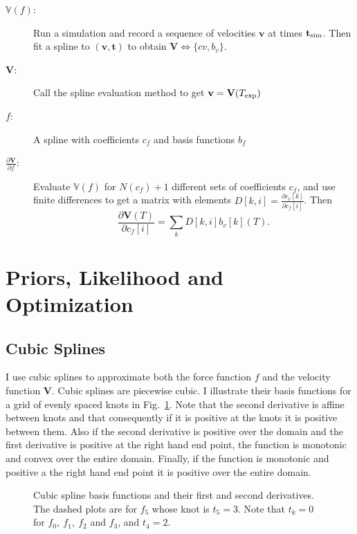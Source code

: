 \documentclass[11pt]{article}
\newcommand{\partiald}[2]{\frac{\partial #1}{\partial #2}}
\newcommand\bv{\mathbf{v}}
\newcommand\bt{\mathbf{t}}
\newcommand\Vfunc{\mathbb{V}}
\newcommand\Vt{\mathbf{V}}
\newcommand\texp{T_{\rm{exp}}}
\newcommand\cf{c_f}
\newcommand\cv{c_v}
\newcommand\fbasis{b_f}
\newcommand\vbasis{b_v}
\newcommand\tsim{{\mathbf t}_{\rm{sim}}}
\newcommand\DVDf{\partiald{\Vt}{f}}
\begin{document}
\begin{description}
\item[$\Vfunc(f)$:] Run a simulation and record a sequence of
  velocities $\bv$ at times $\tsim$.  Then fit a
  spline to $(\bv, \bt)$ to obtain $\Vt\iff \{cv,\vbasis\}$.
\item[$\Vt$:] Call the spline evaluation method to get $\bv = \Vt(\texp)$
\item[$f$:] A spline with coefficients $\cf$ and basis functions
  $\fbasis$
\item[$\DVDf$:] Evaluate $\Vfunc(f)$ for $N(\cf)+1$ different sets of
  coefficients $\cf$, and use finite differences to get a matrix with
  elements $D[k,i] = \partiald{\cv[k]}{\cf[i]}$.  Then
  \begin{equation*}
    \partiald{\Vt(T)}{\cf[i]} = \sum_k D[k,i] \vbasis[k](T).
  \end{equation*}
\end{description}

\section{Priors, Likelihood and Optimization}
\label{sec:opt}

\subsection{Cubic Splines}
\label{sec:splines}

I use cubic splines to approximate both the force function $f$ and the
velocity function $\Vt$.  Cubic splines are piecewise cubic.  I
illustrate their basis functions for a grid of evenly spaced knots in
Fig.~\ref{fig:basis}.  Note that the second derivative is affine
between knots and that consequently if it is positive at the knots it
is positive between them.  Also if the second derivative is positive
over the domain and the first derivative is positive at the right hand
end point, the function is monotonic and convex over the entire
domain.  Finally, if the function is monotonic and positive a the
right hand end point it is positive over the entire domain.
\begin{figure}
  \centering
    \caption{Cubic spline basis functions and their first and second
      derivatives. The dashed plots are for $f_5$ whose knot is
      $t_5=3$.  Note that $t_k=0$ for $f_0,~f_1,~f_2$ and $f_3$, and
      $t_4=2$.}
  \label{fig:basis}
\end{figure}
\end{document}
